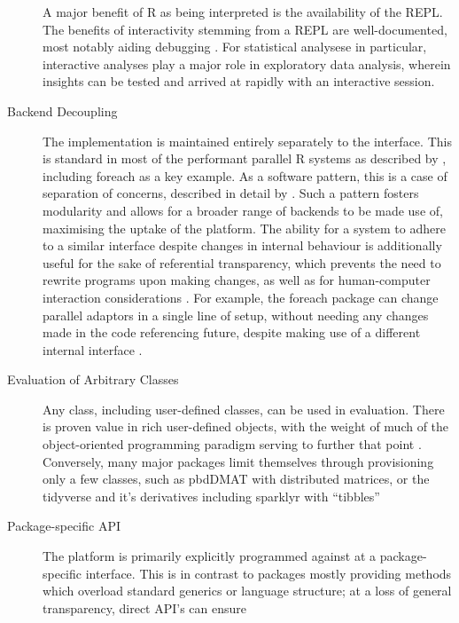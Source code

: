 \documentclass[a4paper,10pt]{article}
\begin{document}
\begin{description}
      A major benefit of R as being interpreted is the availability
      of the REPL. The benefits of interactivity stemming from a REPL
      are well-documented, most notably aiding debugging
      \cite{mccarthy1978history}. For statistical analysese in 
      particular, interactive analyses play a major role in 
      exploratory data analysis, wherein insights can be tested
      and arrived at rapidly with an interactive session.
\item[Backend Decoupling]
      The implementation is maintained entirely separately to the
      interface.
      This is standard in most of the performant parallel R systems
      as described by \citeauthor{eddelbuettel2019parallel}, including
      foreach as a key example\cite{microsoft20}.
      As a software pattern, this is a case of separation of
      concerns, described in detail by \cite{dijkstra1982role}.
      Such a pattern fosters modularity and allows for a broader
      range of backends to be made use of, maximising the uptake of
      the platform.
      The ability for a system to adhere to a similar interface despite
	changes in internal behaviour is additionally useful for the sake of
	referential transparency, which prevents the need to rewrite
	programs upon making changes, as well as for human-computer
	interaction considerations \cite{sondergaard1990Rtda}
	\cite{norman2013design}.
      For example, the foreach package can change parallel adaptors in
      a single line of setup, without needing any changes made in the
      code referencing future, despite making use of a different internal
      interface \cite{weston19:_using}.
\item[Evaluation of Arbitrary Classes]
      Any class, including user-defined classes, can be used in
      evaluation.
      There is proven value in rich user-defined objects, with the
      weight of much of the object-oriented programming paradigm
      serving to further that point \cite{dahl2004simula}.
      Conversely, many major packages limit themselves through
      provisioning only a few classes, such as pbdDMAT with
      distributed matrices, or the tidyverse and it's derivatives
      including sparklyr with ``tibbles'' \cite{pbdDMATpackage}
      \cite{wickham2019welcome}
\item[Package-specific API]
      The platform is primarily explicitly programmed against at a
      package-specific interface. 
      This is in contrast to packages mostly providing methods which
      overload standard generics or language structure;
      at a loss of general transparency, direct API's can ensure

\end{description}
\end{document}
